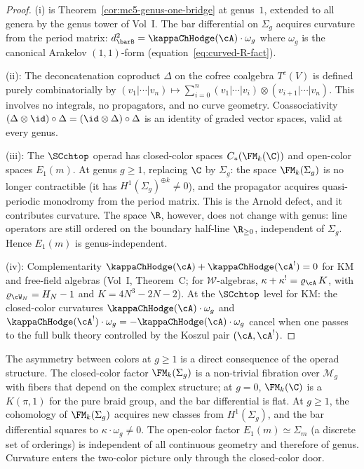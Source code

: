 \begin{proof}
(i) is Theorem~\ref{cor:mc5-genus-one-bridge} at genus~$1$,
extended to all genera by the genus tower of Vol~I\@. The bar
differential on $\Sigma_g$ acquires curvature from the period
matrix: $d_{\barB}^2 = \kappaChHodge(\cA) \cdot \omega_g$ where
$\omega_g$ is the canonical Arakelov $(1,1)$-form
(equation~\eqref{eq:curved-R-fact}).

(ii): The deconcatenation coproduct $\Delta$ on the cofree
coalgebra $T^c(V)$ is defined purely combinatorially by
$(v_1 | \cdots | v_n) \mapsto
\sum_{i=0}^n (v_1 | \cdots | v_i) \otimes
(v_{i+1} | \cdots | v_n)$. This involves no integrals, no
propagators, and no curve geometry. Coassociativity
$(\Delta \otimes \id) \circ \Delta
= (\id \otimes \Delta) \circ \Delta$ is an identity of graded
vector spaces, valid at every genus.

(iii): The $\SCchtop$ operad has closed-color spaces
$C_\ast(\FM_k(\C))$ and open-color spaces $E_1(m)$. At
genus $g \ge 1$, replacing $\C$ by $\Sigma_g$: the space
$\FM_k(\Sigma_g)$ is no longer contractible (it has
$H^1(\Sigma_g)^{\oplus k} \ne 0$), and the propagator acquires
quasi-periodic monodromy from the period matrix. This is
the Arnold defect, and it contributes curvature. The space
$\R$, however, does not change with genus: line operators
are still ordered on the boundary half-line $\R_{\ge 0}$,
independent of $\Sigma_g$. Hence $E_1(m)$ is genus-independent.

(iv): Complementarity $\kappaChHodge(\cA) + \kappaChHodge(\cA^!) = 0$ for KM and free-field algebras
(Vol~I, Theorem~C; for $\mathcal{W}$-algebras, $\kappa + \kappa^! = \varrho_{\cA}\,K$,
with $\varrho_{\cW_N} = H_N - 1$ and $K = 4N^3 - 2N - 2$).
At the $\SCchtop$ level for KM: the closed-color
curvatures $\kappaChHodge(\cA) \cdot \omega_g$ and
$\kappaChHodge(\cA^!) \cdot \omega_g = -\kappaChHodge(\cA) \cdot \omega_g$
cancel when one passes to the full bulk theory controlled by
the Koszul pair $(\cA, \cA^!)$.
\end{proof}

\begin{remark}
The asymmetry between colors at $g \ge 1$ is a direct
consequence of the operad structure. The closed-color factor
$\FM_k(\Sigma_g)$ is a non-trivial fibration over
$\mathcal{M}_g$ with fibers that depend on the complex
structure; at $g = 0$, $\FM_k(\C)$ is a $K(\pi, 1)$ for the
pure braid group, and the bar differential is flat. At
$g \ge 1$, the cohomology of $\FM_k(\Sigma_g)$ acquires new
classes from $H^1(\Sigma_g)$, and the bar differential squares
to $\kappa \cdot \omega_g \ne 0$. The open-color factor
$E_1(m) \simeq \Sigma_m$ (a discrete set of orderings) is
independent of all continuous geometry and therefore of genus.
Curvature enters the two-color picture only through the
closed-color door.
\end{remark}

